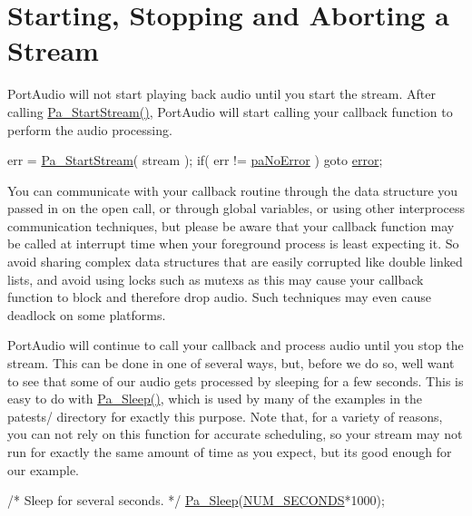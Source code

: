 \hypertarget{start_stop_abort_tut_startstop1}{}\section{Starting, Stopping and Aborting a Stream}\label{start_stop_abort_tut_startstop1}
Port\+Audio will not start playing back audio until you start the stream. After calling \hyperlink{portaudio_8h_a7432aadd26c40452da12fa99fc1a047b}{Pa\+\_\+\+Start\+Stream()}, Port\+Audio will start calling your callback function to perform the audio processing.


\begin{DoxyCode}
err = \hyperlink{portaudio_8h_a7432aadd26c40452da12fa99fc1a047b}{Pa\_StartStream}( stream );
\textcolor{keywordflow}{if}( err != \hyperlink{portaudio_8h_a2e45bf8b5145f131a91c128af2bdaec7aeb09d15a48b6c1034728a9c518cfe4ba}{paNoError} ) \textcolor{keywordflow}{goto} \hyperlink{sndfile__load_8m_a3a81ee160b23b01b04b7c08b35123218}{error};
\end{DoxyCode}


You can communicate with your callback routine through the data structure you passed in on the open call, or through global variables, or using other interprocess communication techniques, but please be aware that your callback function may be called at interrupt time when your foreground process is least expecting it. So avoid sharing complex data structures that are easily corrupted like double linked lists, and avoid using locks such as mutexs as this may cause your callback function to block and therefore drop audio. Such techniques may even cause deadlock on some platforms.

Port\+Audio will continue to call your callback and process audio until you stop the stream. This can be done in one of several ways, but, before we do so, we\textquotesingle{}ll want to see that some of our audio gets processed by sleeping for a few seconds. This is easy to do with \hyperlink{portaudio_8h_a1b3c20044c9401c42add29475636e83d}{Pa\+\_\+\+Sleep()}, which is used by many of the examples in the patests/ directory for exactly this purpose. Note that, for a variety of reasons, you can not rely on this function for accurate scheduling, so your stream may not run for exactly the same amount of time as you expect, but it\textquotesingle{}s good enough for our example.


\begin{DoxyCode}
\textcolor{comment}{/* Sleep for several seconds. */}
\hyperlink{portaudio_8h_a1b3c20044c9401c42add29475636e83d}{Pa\_Sleep}(\hyperlink{sine_8cxx_ab6b46a9cf3ce22ae2cbb6ff903b7afef}{NUM\_SECONDS}*1000);
\end{DoxyCode}


